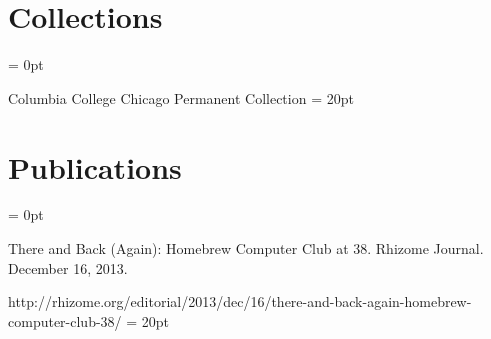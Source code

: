 \section{Collections} \parskip = 0pt
\item{} Columbia College Chicago Permanent Collection
\parskip = 20pt

\section{Publications} \parskip = 0pt
\item{} There and Back (Again): Homebrew Computer Club at 38. Rhizome Journal. December 16, 2013.
\item{} http://rhizome.org/editorial/2013/dec/16/there-and-back-again-homebrew-computer-club-38/
\parskip = 20pt

\bye
